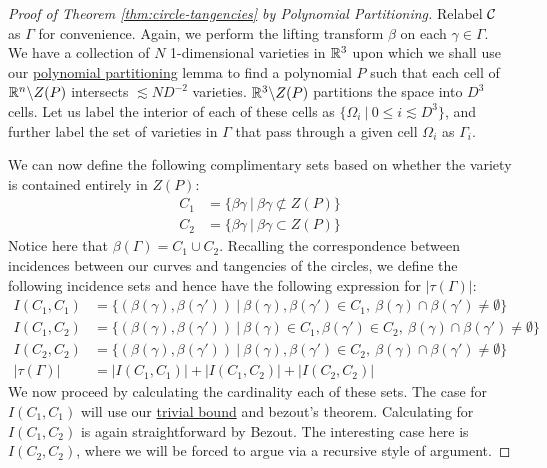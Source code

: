 \begin{proof}[Proof of Theorem \ref{thm:circle-tangencies} by Polynomial Partitioning]
Relabel $\mathcal C$ as $\Gamma$ for convenience. Again, we perform the lifting transform $\beta$ on each $\gamma \in \Gamma$. 
We have a collection of $N$ 1-dimensional varieties in $\mathbb R^3$ upon which we shall use our \hyperref[lem:poly-part-var]{polynomial partitioning} lemma
to find a polynomial $P$ such that each cell of $\mathbb R^n \backslash Z(P)$ intersects $\lesssim N D^{-2}$ varieties. 
$\mathbb R^3 \backslash Z(P)$ partitions the space into $D^3$ cells. 
Let us label the interior of each of these cells as $\{\Omega_i \ | \ 0 \leq i \lesssim D^3 \}$, and further label the set of varieties in $\Gamma$ that pass through a given cell $\Omega_i$ as $\Gamma_i$.

We can now define the following complimentary sets based on whether the variety is contained entirely in $Z(P)$:
\begin{align*}
    C_1 &= \{ \beta{\gamma} \ |\ \beta{\gamma} \not \subset Z(P) \}\\
    C_2 &= \{ \beta{\gamma} \ |\ \beta{\gamma}  \subset Z(P) \}
\end{align*}
Notice here that $\beta(\Gamma) = C_1 \cup C_2$. Recalling the correspondence between incidences between our curves and tangencies of the circles, we define the following
incidence sets and hence have the following expression for $|\tau(\Gamma)|$:
\begin{align*}
    I(C_1, C_1) &= \{(\beta(\gamma), \beta(\gamma')) \ |  \ \beta(\gamma), \beta(\gamma') \in C_1, \ \beta(\gamma) \cap \beta(\gamma') \neq \emptyset \} \\
    I(C_1, C_2) &= \{(\beta(\gamma), \beta(\gamma')) \ |  \ \beta(\gamma)\in C_1, \beta(\gamma') \in C_2, \ \beta(\gamma) \cap \beta(\gamma') \neq \emptyset \} \\
    I(C_2, C_2) &= \{(\beta(\gamma), \beta(\gamma')) \ |  \ \beta(\gamma), \beta(\gamma') \in C_2, \ \beta(\gamma) \cap \beta(\gamma') \neq \emptyset \} \\
    |\tau(\Gamma)| &= |I(C_1, C_1)| + |I(C_1, C_2)| + |I(C_2, C_2)|
\end{align*}
We now proceed by calculating the cardinality each of these sets. The case for $I(C_1,C_1)$ will use our \hyperref[thm:trivial-circle-bound]{trivial bound} and bezout's
theorem. Calculating for $I(C_1,C_2)$ is again straightforward by Bezout. 
The interesting case here is $I(C_2,C_2)$, where we will be forced to argue via a recursive style of argument.


\end{proof}
